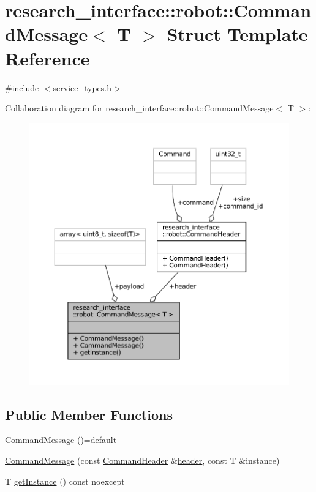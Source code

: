 \hypertarget{structresearch__interface_1_1robot_1_1CommandMessage}{}\section{research\+\_\+interface\+:\+:robot\+:\+:Command\+Message$<$ T $>$ Struct Template Reference}
\label{structresearch__interface_1_1robot_1_1CommandMessage}


{\ttfamily \#include $<$service\+\_\+types.\+h$>$}



Collaboration diagram for research\+\_\+interface\+:\+:robot\+:\+:Command\+Message$<$ T $>$\+:
\nopagebreak
\begin{figure}[H]
\begin{center}
\leavevmode
\includegraphics[width=350pt]{structresearch__interface_1_1robot_1_1CommandMessage__coll__graph}
\end{center}
\end{figure}
\subsection*{Public Member Functions}
\begin{DoxyCompactItemize}
\item 
\hyperlink{structresearch__interface_1_1robot_1_1CommandMessage_aba81088f0b27b77f2a566d16f580000b}{Command\+Message} ()=default
\item 
\hyperlink{structresearch__interface_1_1robot_1_1CommandMessage_aaadf555f1dc8b12a08427aa8fdcbade2}{Command\+Message} (const \hyperlink{structresearch__interface_1_1robot_1_1CommandHeader}{Command\+Header} \&\hyperlink{structresearch__interface_1_1robot_1_1CommandMessage_a62fe6afacf849021d3b1c5b44ef3f364}{header}, const T \&instance)
\item 
T \hyperlink{structresearch__interface_1_1robot_1_1CommandMessage_af90e44d04779770074185f82c8b024fe}{get\+Instance} () const noexcept
\end{DoxyCompactItemize}
